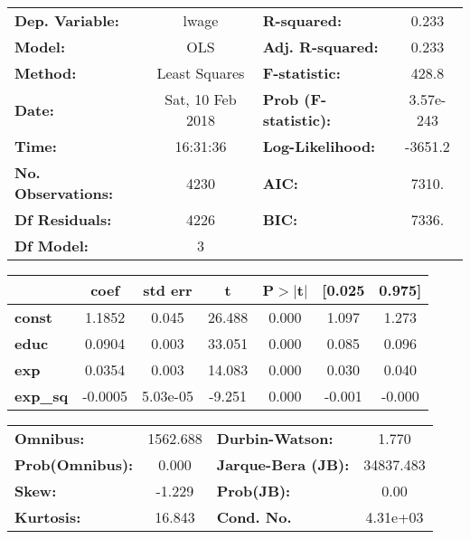 \begin{center}
\begin{tabular}{lclc}
\toprule
\textbf{Dep. Variable:}    &      lwage       & \textbf{  R-squared:         } &     0.233   \\
\textbf{Model:}            &       OLS        & \textbf{  Adj. R-squared:    } &     0.233   \\
\textbf{Method:}           &  Least Squares   & \textbf{  F-statistic:       } &     428.8   \\
\textbf{Date:}             & Sat, 10 Feb 2018 & \textbf{  Prob (F-statistic):} & 3.57e-243   \\
\textbf{Time:}             &     16:31:36     & \textbf{  Log-Likelihood:    } &   -3651.2   \\
\textbf{No. Observations:} &        4230      & \textbf{  AIC:               } &     7310.   \\
\textbf{Df Residuals:}     &        4226      & \textbf{  BIC:               } &     7336.   \\
\textbf{Df Model:}         &           3      & \textbf{                     } &             \\
\bottomrule
\end{tabular}
\begin{tabular}{lcccccc}
                 & \textbf{coef} & \textbf{std err} & \textbf{t} & \textbf{P$>$$|$t$|$} & \textbf{[0.025} & \textbf{0.975]}  \\
\midrule
\textbf{const}   &       1.1852  &        0.045     &    26.488  &         0.000        &        1.097    &        1.273     \\
\textbf{educ}    &       0.0904  &        0.003     &    33.051  &         0.000        &        0.085    &        0.096     \\
\textbf{exp}     &       0.0354  &        0.003     &    14.083  &         0.000        &        0.030    &        0.040     \\
\textbf{exp\_sq} &      -0.0005  &     5.03e-05     &    -9.251  &         0.000        &       -0.001    &       -0.000     \\
\bottomrule
\end{tabular}
\begin{tabular}{lclc}
\textbf{Omnibus:}       & 1562.688 & \textbf{  Durbin-Watson:     } &     1.770  \\
\textbf{Prob(Omnibus):} &   0.000  & \textbf{  Jarque-Bera (JB):  } & 34837.483  \\
\textbf{Skew:}          &  -1.229  & \textbf{  Prob(JB):          } &      0.00  \\
\textbf{Kurtosis:}      &  16.843  & \textbf{  Cond. No.          } &  4.31e+03  \\
\bottomrule
\end{tabular}
\end{center}